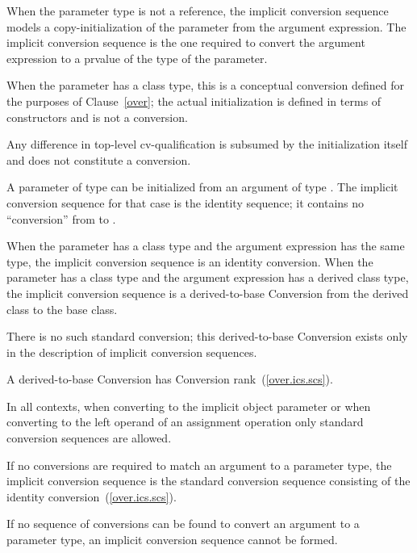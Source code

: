 \pnum
When the parameter type is not a reference, the implicit conversion
sequence models a copy-initialization of the parameter from the argument
expression.
The implicit conversion sequence is the one required to convert the
argument expression to a prvalue of the type of
the parameter.
\begin{note}
When the parameter has a class type, this is a conceptual conversion
defined for the purposes of Clause~\ref{over}; the actual initialization is
defined in terms of constructors and is not a conversion.
\end{note}
Any difference in top-level cv-qualification is
subsumed by the initialization itself and does not constitute a conversion.
\begin{example}
A parameter of type
can be initialized from an argument of type
.
The implicit conversion sequence for that case is the identity sequence; it
contains no ``conversion'' from
to
.
\end{example}
When the parameter has a class type and the argument expression has the
same type, the implicit conversion sequence is an identity conversion.
When the parameter has a class type and the argument expression has a
derived class type, the implicit conversion sequence is a
derived-to-base
%
Conversion from the derived class to the base class.
\begin{note}
There is no such standard conversion; this derived-to-base Conversion exists
only in the description of implicit conversion sequences.
\end{note}
A derived-to-base Conversion has Conversion rank~(\ref{over.ics.scs}).

\pnum
In all contexts, when converting to the implicit object parameter
or when converting to the left operand of an assignment operation
only standard conversion sequences are allowed.

\pnum
If no conversions are required to match an argument to a
parameter type, the implicit conversion sequence is the standard
conversion sequence consisting of the identity conversion~(\ref{over.ics.scs}).

\pnum
If no sequence of conversions can be found to convert an argument
to a parameter type, an implicit conversion sequence cannot be formed.

